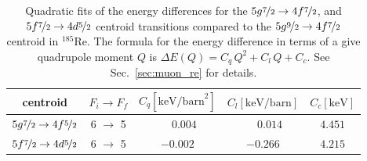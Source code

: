 \begin{table}[b]
\caption{\label{tab:re185centroid}%
Quadratic fits of the energy differences for the $5g\nicefrac{7}{2}\rightarrow4f\nicefrac{7}{2}$, and $5f\nicefrac{7}{2}\rightarrow4d\nicefrac{5}{2}$ centroid transitions compared to the $5g\nicefrac{9}{2}\rightarrow4f\nicefrac{7}{2}$ centroid in $^{185}$Re. The formula for the energy difference in terms of a give quadrupole moment $Q$ is $\Delta E(Q)=C_q \, Q^2 + C_l \, Q + C_c$. See Sec.~\ref{sec:muon_re} for details.}
\centering
\begin{small}
\begin{tabular}{cc|ccc}
centroid& $F_i \rightarrow F_f$ & $C_q [\text{keV/barn}^2]$ & $C_l [\text{keV/barn}]$ & $C_c [\text{keV}]$\\[1pt]\hline%
$5g\nicefrac{7}{2} \rightarrow 4f\nicefrac{5}{2}$ &6 $\rightarrow$ 5&$\phantom{-}0.004$&$\phantom{-}0.014$&$4.451$\\
$5f\nicefrac{7}{2} \rightarrow 4d\nicefrac{5}{2}$&6 $\rightarrow$ 5&$-0.002$&$-0.266$&$4.215$\\
\end{tabular}
\end{small}
\end{table}%
%
%
%
